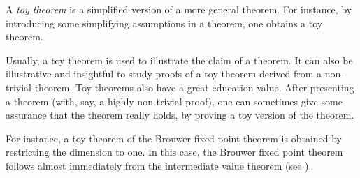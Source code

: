 \documentclass[12pt]{article}
\begin{document}
A \emph{toy theorem} is a simplified version of a more general theorem.
For instance, by introducing some simplifying assumptions in a theorem,
one obtains a toy theorem.

Usually, a toy theorem is used to illustrate the claim of a theorem. 
It can also be illustrative and insightful to study proofs of
a toy theorem derived from a non-trivial theorem. 
Toy theorems also have a great education value. 
After presenting a theorem (with, say, a highly non-trivial proof),
one can sometimes give some assurance that the theorem
really holds, by proving a toy version of the theorem. 

For instance, a toy theorem of the Brouwer fixed point theorem
is obtained by restricting the dimension to one.
In this case, the Brouwer fixed point theorem follows
almost immediately from the intermediate value theorem
(see ).
\end{document}
